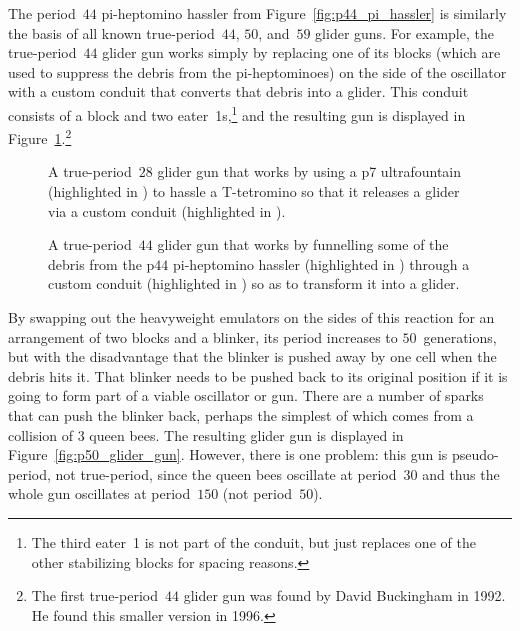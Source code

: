 The period~$44$ pi-heptomino hassler from Figure~\ref{fig:p44_pi_hassler} is similarly the basis of all known true-period~$44$, $50$, and~$59$ glider guns. For example, the true-period~$44$ glider gun works simply by replacing one of its blocks (which are used to suppress the debris from the pi-heptominoes) on the side of the oscillator with a custom conduit that converts that debris into a glider. This conduit consists of a block and two eater~1s,\footnote{The third eater~1 is not part of the conduit, but just replaces one of the other stabilizing blocks for spacing reasons.} and the resulting gun is displayed in Figure~\ref{fig:p44_glider_gun}.\footnote{The first true-period~$44$ glider gun was found by David Buckingham in 1992. He found this smaller version in 1996.}

\begin{figure}[!htb]
	\centering
	\begin{minipage}{.55\textwidth}
		\centering
		\caption{A true-period~$28$ glider gun that works by using a p7 ultrafountain (highlighted in ) to hassle a T-tetromino so that it releases a glider via a custom conduit (highlighted in ).}\label{fig:p28_glider_gun}
	\end{minipage} \hfill %
	\begin{minipage}{.42\textwidth}
		\centering
		\caption{A true-period~$44$ glider gun that works by funnelling some of the debris from the p$44$ pi-heptomino hassler (highlighted in ) through a custom conduit (highlighted in ) so as to transform it into a glider.}\label{fig:p44_glider_gun}
	\end{minipage}
\end{figure}

By swapping out the heavyweight emulators on the sides of this reaction for an arrangement of two blocks and a blinker, its period increases to $50$~generations, but with the disadvantage that the blinker is pushed away by one cell when the debris hits it. That blinker needs to be pushed back to its original position if it is going to form part of a viable oscillator or gun. There are a number of sparks that can push the blinker back, perhaps the simplest of which comes from a collision of $3$ queen bees. The resulting glider gun is displayed in Figure~\ref{fig:p50_glider_gun}. However, there is one problem: this gun is pseudo-period, not true-period, since the queen bees oscillate at period~$30$ and thus the whole gun oscillates at period~$150$ (not period~$50$).

